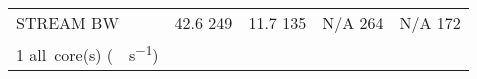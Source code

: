 \begin{center}
\begin{adjustbox}{max width=\textwidth, max height=\textheight}
\begin{tabular}{lrrrr}
			\midrule
			STREAM BW                                               & \num{42.6} \textbar{} \num{249} & \num{11.7} \textbar{} \num{135} & N/A \textbar{} \num{264}  & N/A \textbar{} \num{172}   \\
			1 \textbar{} all~core(s) (\unit{\giga\byte\per\second}) &                                 &                                 &                           &                            \\
			\bottomrule
		\end{tabular}
	\end{adjustbox}
\end{center}